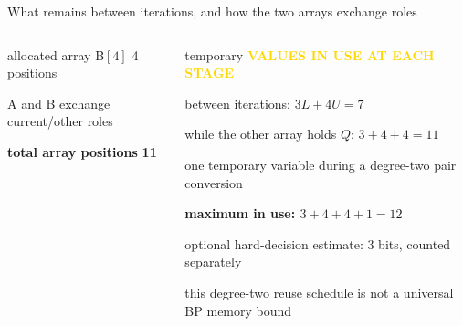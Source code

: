 \documentclass[aspectratio=169,9pt,t]{beamer}
\begin{document}
\begin{frame}{What remains between iterations, and how the two arrays exchange roles}
\begin{columns}[T,onlytextwidth]
\begin{beamercolorbox}[rounded=true,sep=.8ex]{allocated}
        array B$[4]$ \hfill 4 positions\par
        A and B exchange current/other roles\par
        \textbf{total array positions} \hfill \textbf{11}
      \end{beamercolorbox}
      \vspace{1mm}
      \begin{beamercolorbox}[rounded=true,sep=.8ex]{temporary}
        \scriptsize\textcolor{Gold}{\bfseries VALUES IN USE AT EACH STAGE}\par\vspace{.5mm}
        \fontsize{7.2}{8.3}\selectfont
        between iterations: $3L+4U=7$\par
        while the other array holds $Q$: $3+4+4=11$\par
        one temporary variable during a degree-two pair conversion\par
        \textbf{maximum in use: $3+4+4+1=12$}\par
        optional hard-decision estimate: 3 bits, counted separately\par
        this degree-two reuse schedule is not a universal BP memory bound
      \end{beamercolorbox}
  \end{columns}
\end{frame}
\end{document}
